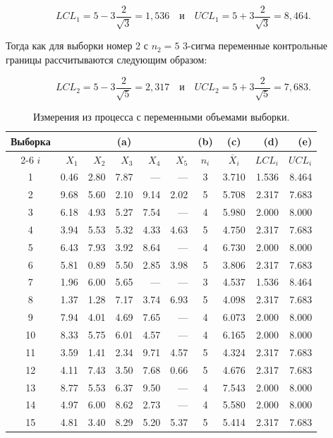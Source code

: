 \[
LCL_1 = 5 - 3\frac{2}{\sqrt{3}} = 1,536 \quad \text{и} \quad UCL_1 = 5 + 3\frac{2}{\sqrt{3}} = 8,464.
\]

Тогда как для выборки номер 2 с \(n_2 = 5\) 3-сигма переменные контрольные границы рассчитываются следующим образом:

\[
LCL_2 = 5 - 3\frac{2}{\sqrt{5}} = 2,317 \quad \text{и} \quad UCL_2 = 5 + 3\frac{2}{\sqrt{5}} = 7,683.
\]

\begin{table}[htbp]
	\centering
	\caption{Измерения из процесса с переменными объемами выборки.}
	\label{tab:2.3}
	\renewcommand{\arraystretch}{1.1} %
	\begin{tabular}{c *{5}{r} c c r r}
		\toprule
		Выборка & \multicolumn{5}{c}{(a)} & (b) & (c) & (d) & (e) \\
		\cmidrule(lr){2-6}
		\(i\) & \(X_1\) & \(X_2\) & \(X_3\) & \(X_4\) & \(X_5\) & \(n_i\) & \(\overline{X}_i\) & \(LCL_i\) & \(UCL_i\) \\
		\midrule
		1  & 0.46 & 2.80 & 7.87 & ---   & ---   & 3 & 3.710 & 1.536 & 8.464 \\
		2  & 9.68 & 5.60 & 2.10 & 9.14  & 2.02  & 5 & 5.708 & 2.317 & 7.683 \\
		3  & 6.18 & 4.93 & 5.27 & 7.54  & ---   & 4 & 5.980 & 2.000 & 8.000 \\
		4  & 3.94 & 5.53 & 5.32 & 4.33  & 4.63  & 5 & 4.750 & 2.317 & 7.683 \\
		5  & 6.43 & 7.93 & 3.92 & 8.64  & ---   & 4 & 6.730 & 2.000 & 8.000 \\
		6  & 5.81 & 0.89 & 5.50 & 2.85  & 3.98  & 5 & 3.806 & 2.317 & 7.683 \\
		7  & 1.96 & 6.00 & 5.65 & ---   & ---   & 3 & 4.537 & 1.536 & 8.464 \\
		8  & 1.37 & 1.28 & 7.17 & 3.74  & 6.93  & 5 & 4.098 & 2.317 & 7.683 \\
		9  & 7.94 & 4.01 & 4.69 & 7.65  & ---   & 4 & 6.073 & 2.000 & 8.000 \\
		10 & 8.33 & 5.75 & 6.01 & 4.57  & ---   & 4 & 6.165 & 2.000 & 8.000 \\
		11 & 3.59 & 1.41 & 2.34 & 9.71  & 4.57  & 5 & 4.324 & 2.317 & 7.683 \\
		12 & 4.11 & 7.43 & 3.50 & 7.68  & 0.66  & 5 & 4.676 & 2.317 & 7.683 \\
		13 & 8.77 & 5.53 & 6.37 & 9.50  & ---   & 4 & 7.543 & 2.000 & 8.000 \\
		14 & 4.97 & 6.00 & 8.62 & 2.73  & ---   & 4 & 5.580 & 2.000 & 8.000 \\
		15 & 4.81 & 3.40 & 8.29 & 5.20  & 5.37  & 5 & 5.414 & 2.317 & 7.683 \\
		\bottomrule
	\end{tabular}
\end{table}

